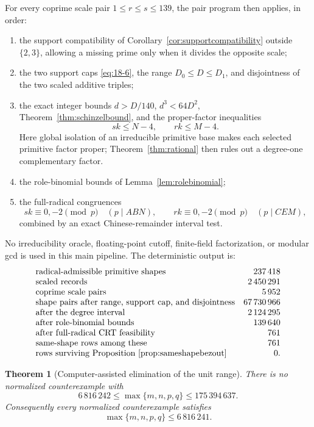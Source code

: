 \documentclass[11pt]{article}
\numberwithin{equation}{section}
\newtheorem{theorem}{Theorem}[section]
\theoremstyle{definition}
\begin{document}
For every coprime scale pair \(1\leq r\leq s\leq139\), the pair program
then applies, in order:
\begin{enumerate}[label=(\arabic*)]
\item the support compatibility of Corollary~\ref{cor:supportcompatibility}
outside \(\{2,3\}\), allowing a missing prime only when it divides the
opposite scale;
\item the two support caps \eqref{eq:18-6}, the range \(D_0\leq D\leq D_1\),
and disjointness of the two scaled additive triples;
\item the exact integer bounds \(d>D/140\), \(d^3<64D^2\),
Theorem~\ref{thm:schinzelbound}, and the proper-factor inequalities
\[
 sk\leq N-4,
 \qquad rk\leq M-4.
\]
Here global isolation of an irreducible primitive base makes each selected
primitive factor proper; Theorem~\ref{thm:rational} then rules out a
degree-one complementary factor.
\item the role-binomial bounds of Lemma~\ref{lem:rolebinomial};
\item the full-radical congruences
\[
 sk\equiv0,-2\pmod p\quad(p\mid ABN),
 \qquad
 rk\equiv0,-2\pmod p\quad(p\mid CEM),
\]
combined by an exact Chinese-remainder interval test.
\end{enumerate}
No irreducibility oracle, floating-point cutoff, finite-field factorization,
or modular gcd is used in this main pipeline.  The deterministic output is:
\[
\begin{array}{lr}
\text{radical-admissible primitive shapes}&237\,418\\
\text{scaled records}&2\,450\,291\\
\text{coprime scale pairs}&5\,952\\
\text{shape pairs after range, support cap, and disjointness}&67\,730\,966\\
\text{after the degree interval}&2\,124\,295\\
\text{after role-binomial bounds}&139\,640\\
\text{after full-radical CRT feasibility}&761\\
\text{same-shape rows among these}&761\\
\text{rows surviving Proposition~\ref{prop:sameshapebezout}}&0.
\end{array}
\]

\begin{theorem}[Computer-assisted elimination of the unit range]
\label{thm:upperelimination}
There is no normalized counterexample with
\[
 6\,816\,242\leq\max\{m,n,p,q\}\leq175\,394\,637.
\]
Consequently every normalized counterexample satisfies
\begin{equation}
 \boxed{\max\{m,n,p,q\}\leq6\,816\,241.}
 \label{eq:18-10}
\end{equation}
\end{theorem}
\end{document}

